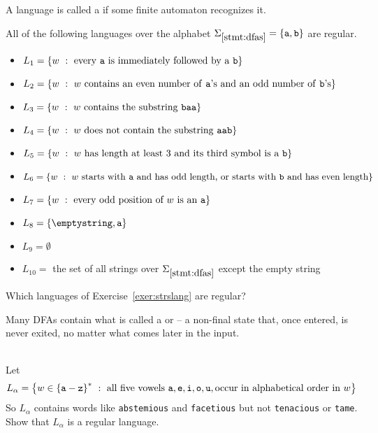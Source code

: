 \documentclass[twoside,letterpaper,openany]{book}
\begin{document}
\begin{defn}
A language is called a  if some finite automaton recognizes it.
\end{defn}

\begin{stmt}\label{stmt:dfas}
All of the following languages over the alphabet $\Sigma_{\ref{stmt:dfas}} = \left\lbrace \texttt{a}, \texttt{b} \right\rbrace$ are regular.
\begin{itemize}
\item $L_1 = \left\lbrace w\ :\ \textrm{every \texttt{a} is immediately followed by a \texttt{b}} \right\rbrace$
\item $L_2 = \left\lbrace w\ :\ w~\textrm{contains an even number of \texttt{a}'s and an odd number of \texttt{b}'s} \right\rbrace$
\item $L_3 = \left\lbrace w\ :\ w~\textrm{contains the substring \texttt{baa}} \right\rbrace$
\item $L_4 = \left\lbrace w\ :\ w~\textrm{does not contain the substring \texttt{aab}} \right\rbrace$
\item $L_5 = \left\lbrace w\ :\ w~\textrm{has length at least 3 and its third symbol is a}~\texttt{b} \right\rbrace$
\item $L_6 = \left\lbrace w\ :\ w~\textrm{starts with \texttt{a} and has odd length, or starts with \texttt{b} and has even length} \right\rbrace$
\item $L_7 = \left\lbrace w\ :\ \textrm{every odd position of}~w~\textrm{is an}~\texttt{a} \right\rbrace$
\item $L_8 = \setdef{\emptystring, \texttt{a}}$
\item $L_9 = \emptyset$
\item $L_{10} = $ the set of all strings over $\Sigma_{\ref{stmt:dfas}}$ except the empty string
\end{itemize}
\end{stmt}

\begin{exer}\label{stmt:dfas}
Which languages of Exercise~\ref{exer:strslang} are regular?
\end{exer}

\begin{discussion}
Many DFAs contain what is called a  or  -- a non-final state that, once entered, is never exited, no matter what comes later in the input. 
\end{discussion}

\begin{exer}~\\
Let \[L_\alpha = \setbuild{w \in \setstar{\setdef{\texttt{a} - \texttt{z}}}}{\textrm{all five vowels}\ \texttt{a}, \texttt{e},
			\texttt{i}, \texttt{o}, \texttt{u}, \textrm{occur in alphabetical order in}~w}\]
So $L_\alpha$ contains words like \texttt{abstemious} and \texttt{facetious} but not \texttt{tenacious} or \texttt{tame}. Show that $L_\alpha$ is a regular language.
\end{exer}
\end{document}
